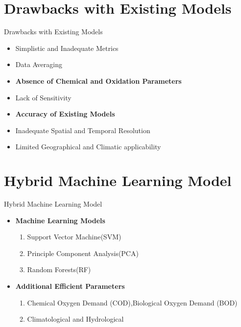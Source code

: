 \documentclass[11pt]{beamer}
\begin{document}
\section{Drawbacks with Existing Models}
    \begin{frame}{Drawbacks with Existing Models}
       \begin{itemize}
           \item Simplistic and Inadequate Metrics 
           \item Data Averaging
           \item \textbf{Absence of Chemical and Oxidation Parameters} 
           \item Lack of Sensitivity
           \item \textbf{Accuracy of Existing Models}
           \item Inadequate Spatial and Temporal Resolution
           \item Limited Geographical and Climatic applicability
       \end{itemize}        
\end{frame}
\section{Hybrid Machine Learning Model}
    \begin{frame}{Hybrid Machine Learning Model}
        \begin{itemize}
                \item \textbf{Machine Learning Models}
           \begin{enumerate}[1]
               \item Support Vector Machine(SVM)
            \item Principle Component Analysis(PCA)
            \item Random Forests(RF)
           \end{enumerate}
            \item \textbf{Additional Efficient Parameters}
            \begin{enumerate}[1]
                \item Chemical Oxygen Demand (COD),Biological Oxygen Demand (BOD) 
            \item Climatological and Hydrological 
            \end{enumerate}
            
        \end{itemize}
        
    \end{frame}
    
\end{document}
